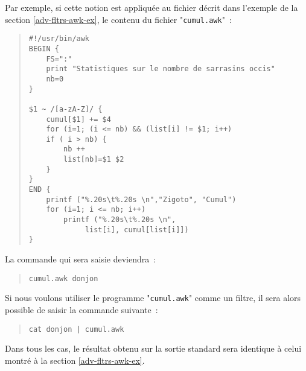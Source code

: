 Par exemple, si cette notion est appliqu{\'e}e au fichier d{\'e}crit dans l'exemple
de la section \ref{adv-fltrs-awk-ex}, le contenu du fichier
"\texttt{cumul.awk}"~:
\begin{quote}
\begin{verbatim}
#!/usr/bin/awk
BEGIN {
    FS=":"
    print "Statistiques sur le nombre de sarrasins occis"
    nb=0
}

$1 ~ /[a-zA-Z]/ {
    cumul[$1] += $4
    for (i=1; (i <= nb) && (list[i] != $1; i++)
    if ( i > nb) {
        nb ++
        list[nb]=$1 $2
    }
}
END {
    printf ("%.20s\t%.20s \n","Zigoto", "Cumul")
    for (i=1; i <= nb; i++)
        printf ("%.20s\t%.20s \n",
             list[i], cumul[list[i]])
}
\end{verbatim}
\end{quote}

La commande qui sera saisie deviendra~:
\begin{quote}
\begin{verbatim}
cumul.awk donjon
\end{verbatim}
\end{quote}

Si nous voulons utiliser le programme "\texttt{cumul.awk}" comme un filtre,
il sera alors possible de saisir la commande suivante~:
\begin{quote}
\begin{verbatim}
cat donjon | cumul.awk
\end{verbatim}
\end{quote}

Dans tous les cas, le r{\'e}sultat obtenu sur la sortie standard sera identique {\`a}
celui montr{\'e} {\`a} la section \ref{adv-fltrs-awk-ex}.
